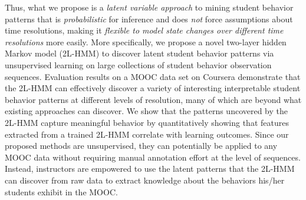 Thus, what we propose is a \emph{latent variable approach} to mining student behavior
patterns that is \emph{probabilistic} for inference and
does \emph{not} force assumptions about time resolutions, making it
\emph{flexible to model state changes over different time resolutions} more
easily.  More specifically, we propose a novel two-layer hidden Markov
model (2L-HMM) to discover latent student behavior patterns via
unsupervised learning on large collections of student behavior observation
sequences.  Evaluation results on a MOOC data set on Coursera demonstrate
that the 2L-HMM can effectively discover a variety of interesting interpretable
student behavior patterns at different levels of resolution, many of which
are beyond what existing approaches can discover. We show that the patterns
uncovered by the 2L-HMM capture meaningful behavior by quantitatively
showing that features extracted from a trained 2L-HMM correlate with
learning outcomes. Since our proposed methods are
unsupervised, they can potentially be applied to any MOOC data without
requiring manual annotation effort at the level of sequences. Instead,
instructors are empowered to use the latent patterns that the 2L-HMM can
discover from raw data to extract knowledge about the behaviors his/her
students exhibit in the MOOC.
